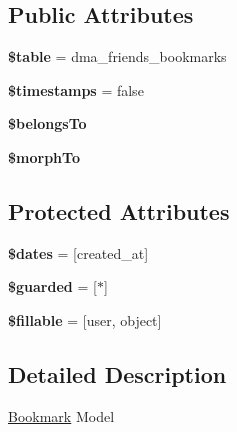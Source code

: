 \subsection*{Public Attributes}
\begin{DoxyCompactItemize}
\item 
\hypertarget{classDMA_1_1Friends_1_1Models_1_1Bookmark_a40fb0c28e22fca220841aa02fa4cd57a}{}{\bfseries \$table} = \textquotesingle{}dma\+\_\+friends\+\_\+bookmarks\textquotesingle{}\label{classDMA_1_1Friends_1_1Models_1_1Bookmark_a40fb0c28e22fca220841aa02fa4cd57a}

\item 
\hypertarget{classDMA_1_1Friends_1_1Models_1_1Bookmark_a28f6465605a4b539097b029883c1ed34}{}{\bfseries \$timestamps} = false\label{classDMA_1_1Friends_1_1Models_1_1Bookmark_a28f6465605a4b539097b029883c1ed34}

\item 
{\bfseries \$belongs\+To}
\item 
{\bfseries \$morph\+To}
\end{DoxyCompactItemize}
\subsection*{Protected Attributes}
\begin{DoxyCompactItemize}
\item 
\hypertarget{classDMA_1_1Friends_1_1Models_1_1Bookmark_aec0930460944ef0645f1126f31af7e66}{}{\bfseries \$dates} = \mbox{[}\textquotesingle{}created\+\_\+at\textquotesingle{}\mbox{]}\label{classDMA_1_1Friends_1_1Models_1_1Bookmark_aec0930460944ef0645f1126f31af7e66}

\item 
\hypertarget{classDMA_1_1Friends_1_1Models_1_1Bookmark_a45353dd30557ec75a8ff23ef53c5831c}{}{\bfseries \$guarded} = \mbox{[}\textquotesingle{}$\ast$\textquotesingle{}\mbox{]}\label{classDMA_1_1Friends_1_1Models_1_1Bookmark_a45353dd30557ec75a8ff23ef53c5831c}

\item 
\hypertarget{classDMA_1_1Friends_1_1Models_1_1Bookmark_a752a22c8b38d6b802046797ea89fc007}{}{\bfseries \$fillable} = \mbox{[}\textquotesingle{}user\textquotesingle{}, \textquotesingle{}object\textquotesingle{}\mbox{]}\label{classDMA_1_1Friends_1_1Models_1_1Bookmark_a752a22c8b38d6b802046797ea89fc007}

\end{DoxyCompactItemize}


\subsection{Detailed Description}
\hyperlink{classDMA_1_1Friends_1_1Models_1_1Bookmark}{Bookmark} Model 


